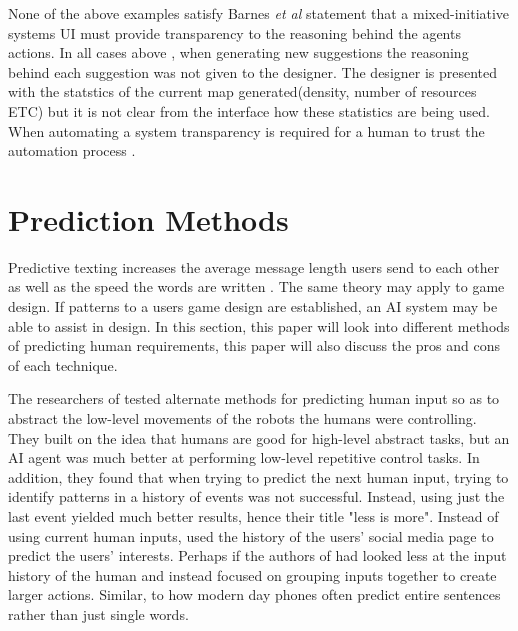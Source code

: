 \documentclass[journal]{IEEEtran}
\begin{document}
None of the above examples \cite{alvarez2018fostering, liapis2013sentient, baldwin2017mixed} satisfy Barnes \textit{et al}\cite{barnes2015designing} statement that a mixed-initiative systems UI must provide transparency to the reasoning behind the agents actions. In all cases above\cite{alvarez2018fostering, liapis2013sentient, baldwin2017mixed} , when generating new suggestions the reasoning behind each suggestion was not given to the designer. The designer is presented with the statstics of the current map generated(density, number of resources ETC) but it is not clear from the interface how these statistics are being used. When automating a system transparency is required for a human to trust the automation process \cite{lee2004trust}.

\section{Prediction Methods} \label{prediction}
Predictive texting increases the average message length users send to each other \cite{ling2005length} as well as the speed the words are written \cite{dunlop2000predictive}. The same theory may apply to game design. If patterns to a users game design are established, an AI system may be able to assist in design. In this section, this paper will look into different methods of predicting human requirements, this paper will also discuss the pros and cons of each technique.

The researchers of \cite{chipalkatty2013less} tested alternate methods for predicting human input so as to abstract the low-level movements of the robots the humans were controlling. They built on the idea that humans are good for high-level abstract tasks, but an AI agent was much better at performing low-level repetitive control tasks. In addition, they found that when trying to predict the next human input, trying to identify patterns in a history of events was not successful. Instead, using just the last event yielded much better results, hence their title "less is more". Instead of using current human inputs, \cite{bhatia2016targeted} used the history of the users' social media page to predict the users' interests. Perhaps if the authors of \cite{chipalkatty2013less} had looked less at the input history of the human and instead focused on grouping inputs together to create larger actions. Similar, to how modern day phones often predict entire sentences rather than just single words.
\end{document}
